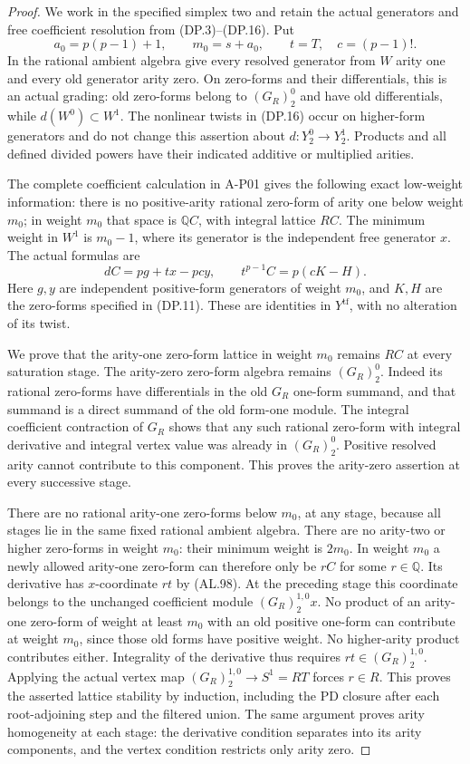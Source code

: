 \begin{proof}
We work in the specified simplex two and retain
the actual generators and free coefficient resolution
from (DP.3)--(DP.16). Put
\[
 a_0=p(p-1)+1,\qquad m_0=s+a_0,\qquad
 t=T,\quad c=(p-1)!.
 \tag{AL.97}
\]
In the rational ambient algebra give every resolved
generator from $W$ arity one and every old generator
arity zero. On zero-forms and their differentials,
this is an actual grading: old zero-forms belong to
$(G_R)_2^0$ and have old differentials, while
$d(W^0)\subset W^1$. The nonlinear twists in
(DP.16) occur on higher-form generators and do not
change this assertion about $d:Y_2^0\to Y_2^1$.
Products and all defined divided powers have their
indicated additive or multiplied arities.

The complete coefficient calculation in A-P01 gives
the following exact low-weight information:
there is no positive-arity rational zero-form of
arity one below weight $m_0$; in weight $m_0$ that
space is $\mathbb Q C$, with integral lattice $RC$.
The minimum weight in $W^1$ is $m_0-1$, where its
generator is the independent free generator $x$.
The actual formulas are
\[
 dC=pg+tx-pcy,\qquad
             t^{p-1}C=p(cK-H).
 \tag{AL.98}
\]
Here $g,y$ are independent positive-form generators
of weight $m_0$, and $K,H$ are the zero-forms
specified in (DP.11). These are identities in
$Y^{\mathrm{tf}}$, with no alteration of its twist.

We prove that the arity-one zero-form lattice in
weight $m_0$ remains $RC$ at every saturation stage.
The arity-zero zero-form algebra remains $(G_R)_2^0$.
Indeed its rational zero-forms have differentials
in the old $G_R$ one-form summand, and that summand
is a direct summand of the old form-one module.
The integral coefficient contraction of $G_R$
shows that any such rational zero-form with integral
derivative and integral vertex value was already
in $(G_R)_2^0$. Positive resolved arity cannot
contribute to this component. This proves the
arity-zero assertion at every successive stage.

There are no rational arity-one zero-forms below
$m_0$, at any stage, because all stages lie in the
same fixed rational ambient algebra. There are no
arity-two or higher zero-forms in weight $m_0$:
their minimum weight is $2m_0$. In weight $m_0$
a newly allowed arity-one zero-form can therefore
only be $rC$ for some $r\in\mathbb Q$.
Its derivative has $x$-coordinate $rt$ by (AL.98).
At the preceding stage this coordinate belongs
to the unchanged coefficient module
$(G_R)_2^{1,0}x$. No product of an arity-one
zero-form of weight at least $m_0$ with an old
positive one-form can contribute at weight $m_0$,
since those old forms have positive weight. No
higher-arity product contributes either.
Integrality of the derivative thus requires
$rt\in(G_R)_2^{1,0}$. Applying the actual vertex
map $(G_R)_2^{1,0}\to S^1=RT$ forces $r\in R$.
This proves the asserted lattice stability by
induction, including the PD closure after each
root-adjoining step and the filtered union.
The same argument proves arity homogeneity at each
stage: the derivative condition separates into
its arity components, and the vertex condition
restricts only arity zero.


\end{proof}
